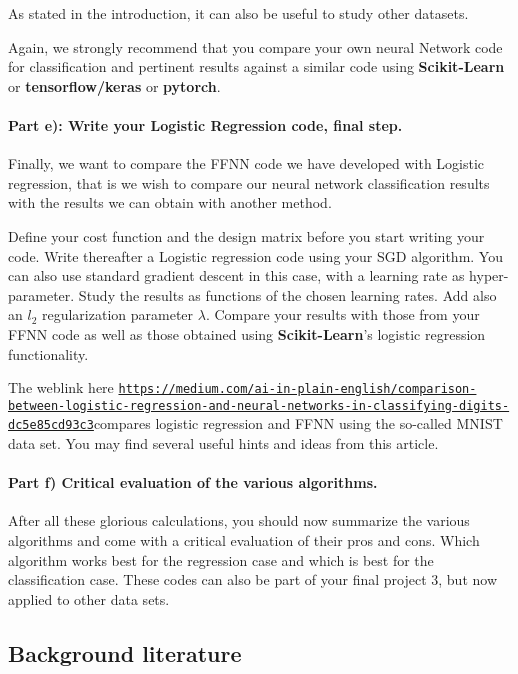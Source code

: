 \documentclass[%
oneside,                 %
final,                   %
10pt]{article}
\begin{document}
As stated in the introduction, it can also be useful to study other
datasets. 

Again, we strongly recommend that you compare your own neural Network
code for classification and pertinent results against a similar code using \textbf{Scikit-Learn}  or \textbf{tensorflow/keras} or \textbf{pytorch}.

\paragraph{Part e): Write your Logistic Regression code, final step.}
Finally, we want to compare the FFNN code we have developed with
Logistic regression, that is we wish to compare our neural network
classification results with the results we can obtain with another
method.

Define your cost function and the design matrix before you start writing your code.
Write thereafter a Logistic regression code using your SGD algorithm. You can also use standard gradient descent in this case, with a learning rate as hyper-parameter.
Study the results as functions of the chosen learning rates.
Add also an $l_2$ regularization parameter $\lambda$. Compare your results with those from your FFNN code as well as those obtained using \textbf{Scikit-Learn}'s logistic regression functionality.

The weblink  here \href{{https://medium.com/ai-in-plain-english/comparison-between-logistic-regression-and-neural-networks-in-classifying-digits-dc5e85cd93c3}}{\nolinkurl{https://medium.com/ai-in-plain-english/comparison-between-logistic-regression-and-neural-networks-in-classifying-digits-dc5e85cd93c3}}compares logistic regression and FFNN using the so-called MNIST data set. You may find several useful hints and ideas from this article. 

\paragraph{Part f) Critical evaluation of the various algorithms.}
After all these glorious calculations, you should now summarize the
various algorithms and come with a critical evaluation of their pros
and cons. Which algorithm works best for the regression case and which
is best for the classification case. These codes can also be part of
your final project 3, but now applied to other data sets.

\subsection{Background literature}
\end{document}
